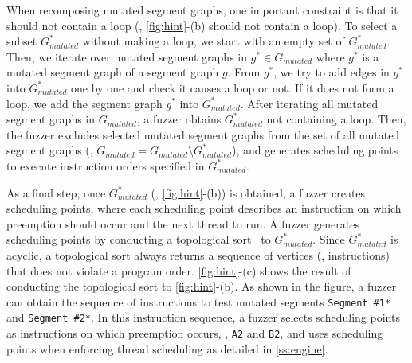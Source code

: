 When recomposing mutated segment graphs, one important constraint is
that it should not contain a loop (\ie, \autoref{fig:hint}-(b) should
not contain a loop). 
%
To select a subset $G^*_{mutated}$ without making a loop, we start
with an empty set of $G^*_{mutated}$. Then, we iterate over mutated
segment graphs in $g^* \in G_{mutated}$ where $g^*$ is a mutated
segment graph of a segment graph $g$.  From $g^*$, we try to add edges
in $g^*$ into $G^*_{mutated}$ one by one and check it causes a loop or
not. If it does not form a loop, we add the segment graph $g^*$ into
$G^*_{mutated}$.
%
After iterating all mutated segment graphs in $G_{mutated}$,
a fuzzer obtains $G^*_{mutated}$ not containing a loop. Then, 
the fuzzer excludes selected mutated segment graphs from the set of 
all mutated segment graphs
(\ie, $G_{mutated} = G_{mutated} \setminus G^*_{mutated}$), and
generates scheduling points to execute instruction orders 
specified in $G^*_{mutated}$.


%
As a final step, once $G^{*}_{mutated}$ (\ie, \autoref{fig:hint}-(b))
is obtained, a fuzzer creates scheduling points, where each scheduling
point describes an instruction on which preemption should occur and
the next thread to run.
%
A fuzzer generates scheduling points by conducting a topological
sort~\cite{topologicalsort} to $G^{*}_{mutated}$.
%
Since $G^{*}_{mutated}$ is acyclic, a topological sort
always returns a sequence of vertices (\ie, instructions) that does
not violate a program order.
%
\dr{}
\autoref{fig:hint}-(c) shows the result of conducting the topological
sort to \autoref{fig:hint}-(b).
%
As shown in the figure, a fuzzer can obtain the sequence of
instructions to test mutated segments \texttt{Segment \#1*} and
\texttt{Segment \#2*}. In this instruction sequence, a fuzzer selects
scheduling points as instructions on which preemption occurs, \ie,
\texttt{A2} and \texttt{B2}, and uses scheduling points when enforcing
thread scheduling as detailed in \autoref{ss:engine}.


%
%




